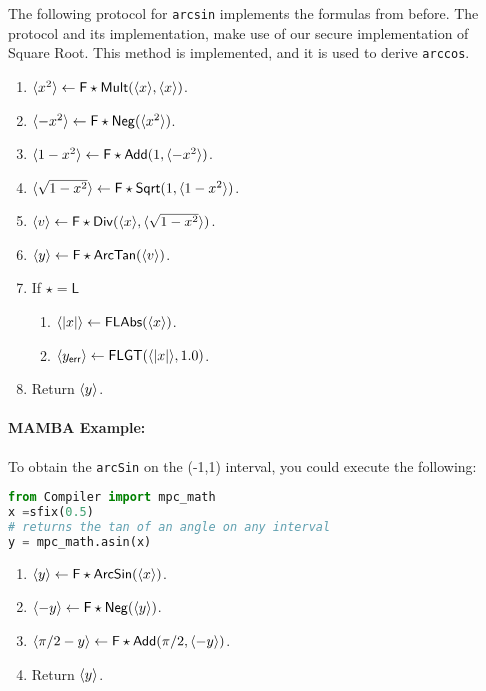 The following protocol for \verb|arcsin| implements the formulas from before. 
The protocol and its implementation, make use of our secure implementation of Square Root. 
This method is implemented, and it is used to derive \verb|arccos|.

\begin{enumerate}
\item $\langle x^2 \rangle \leftarrow \mathsf{F\star Mult}(\langle x \rangle,\langle x \rangle)$.
\item $\langle -x^2 \rangle \leftarrow \mathsf{F\star Neg}(\langle x^2 \rangle)$.
\item $\langle 1-x^2 \rangle \leftarrow \mathsf{F\star Add}(1,\langle -x^2 \rangle)$.
\item $\langle \sqrt{1-x^2} \rangle \leftarrow \mathsf{F\star Sqrt}(1,\langle 1-x^2 \rangle)$.
\item $\langle v \rangle \leftarrow \mathsf{F\star Div}(\langle x \rangle,\langle \sqrt{1-x^2} \rangle)$.
\item $\langle y \rangle \leftarrow \mathsf{F\star ArcTan}(\langle v \rangle)$.
\item If $\star=\mathsf{L}$
\begin{enumerate}
  \item $\langle |x| \rangle \leftarrow \mathsf{FLAbs}(\langle x \rangle)$.
  \item $\langle y_{\mathsf{err}} \rangle \leftarrow \mathsf{FLGT}(\langle |x| \rangle,1.0)$.
\end{enumerate}
\item Return $\langle y \rangle$.
\end{enumerate}


\paragraph{MAMBA Example:} To obtain the \verb|arcSin| on the  (-1,1) interval, you could execute the following:
\begin{lstlisting}[language={python}]
from Compiler import mpc_math
x =sfix(0.5)
# returns the tan of an angle on any interval
y = mpc_math.asin(x)
\end{lstlisting}


\begin{enumerate}
\item $\langle y \rangle \leftarrow \mathsf{F\star ArcSin}(\langle x \rangle)$.
\item $\langle -y \rangle \leftarrow \mathsf{F\star Neg}(\langle y \rangle)$.
\item $\langle \pi/2-y \rangle \leftarrow \mathsf{F\star Add}(\pi/2,\langle -y \rangle)$.
\item Return $\langle y \rangle$.
\end{enumerate}

